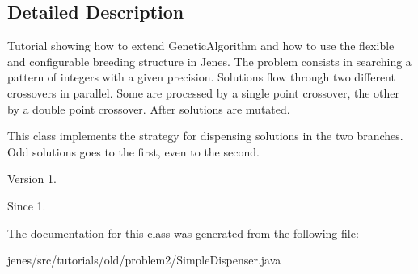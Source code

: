 \subsection{Detailed Description}
Tutorial showing how to extend {\ttfamily Genetic\-Algorithm} and how to use the flexible and configurable breeding structure in Jenes. The problem consists in searching a pattern of integers with a given precision. Solutions flow through two different crossovers in parallel. Some are processed by a single point crossover, the other by a double point crossover. After solutions are mutated.

This class implements the strategy for dispensing solutions in the two branches. Odd solutions goes to the first, even to the second.

\begin{DoxyVersion}{Version}
1.
\end{DoxyVersion}
\begin{DoxySince}{Since}
1. 
\end{DoxySince}


The documentation for this class was generated from the following file\-:\begin{DoxyCompactItemize}
\item 
jenes/src/tutorials/old/problem2/Simple\-Dispenser.\-java\end{DoxyCompactItemize}
